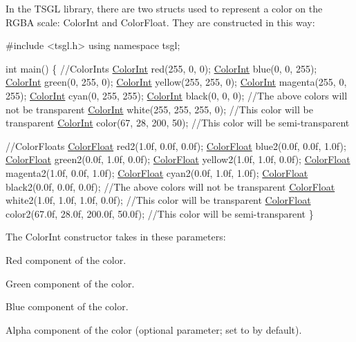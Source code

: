 In the T\-S\-G\-L library, there are two structs used to represent a color on the R\-G\-B\-A scale\-: {\ttfamily Color\-Int} and {\ttfamily Color\-Float}. They are constructed in this way\-:


\begin{DoxyCode}
\textcolor{preprocessor}{#include <tsgl.h>}
\textcolor{keyword}{using namespace }tsgl;

\textcolor{keywordtype}{int} main() \{
  \textcolor{comment}{//ColorInts}
  \hyperlink{structtsgl_1_1_color_int}{ColorInt} red(255, 0, 0); 
  \hyperlink{structtsgl_1_1_color_int}{ColorInt} blue(0, 0, 255);
  \hyperlink{structtsgl_1_1_color_int}{ColorInt} green(0, 255, 0); 
  \hyperlink{structtsgl_1_1_color_int}{ColorInt} yellow(255, 255, 0);
  \hyperlink{structtsgl_1_1_color_int}{ColorInt} magenta(255, 0, 255);
  \hyperlink{structtsgl_1_1_color_int}{ColorInt} cyan(0, 255, 255);
  \hyperlink{structtsgl_1_1_color_int}{ColorInt} black(0, 0, 0);
  \textcolor{comment}{//The above colors will not be transparent}
  \hyperlink{structtsgl_1_1_color_int}{ColorInt} white(255, 255, 255, 0);  \textcolor{comment}{//This color will be transparent}
  \hyperlink{structtsgl_1_1_color_int}{ColorInt} color(67, 28, 200, 50); \textcolor{comment}{//This color will be semi-transparent  }


  \textcolor{comment}{//ColorFloats}
  \hyperlink{structtsgl_1_1_color_float}{ColorFloat} red2(1.0f, 0.0f, 0.0f); 
  \hyperlink{structtsgl_1_1_color_float}{ColorFloat} blue2(0.0f, 0.0f, 1.0f);
  \hyperlink{structtsgl_1_1_color_float}{ColorFloat} green2(0.0f, 1.0f, 0.0f); 
  \hyperlink{structtsgl_1_1_color_float}{ColorFloat} yellow2(1.0f, 1.0f, 0.0f);
  \hyperlink{structtsgl_1_1_color_float}{ColorFloat} magenta2(1.0f, 0.0f, 1.0f);
  \hyperlink{structtsgl_1_1_color_float}{ColorFloat} cyan2(0.0f, 1.0f, 1.0f);
  \hyperlink{structtsgl_1_1_color_float}{ColorFloat} black2(0.0f, 0.0f, 0.0f);
  \textcolor{comment}{//The above colors will not be transparent}
  \hyperlink{structtsgl_1_1_color_float}{ColorFloat} white2(1.0f, 1.0f, 1.0f, 0.0f); \textcolor{comment}{//This color will be transparent}
  \hyperlink{structtsgl_1_1_color_float}{ColorFloat} color2(67.0f, 28.0f, 200.0f, 50.0f); \textcolor{comment}{//This color will be semi-transparent }
\}
\end{DoxyCode}


The {\ttfamily Color\-Int} constructor takes in these parameters\-:


\begin{DoxyItemize}
\item Red component of the color.
\item Green component of the color.
\item Blue component of the color.
\item Alpha component of the color (optional parameter; set to {} by default).
\end{DoxyItemize}

